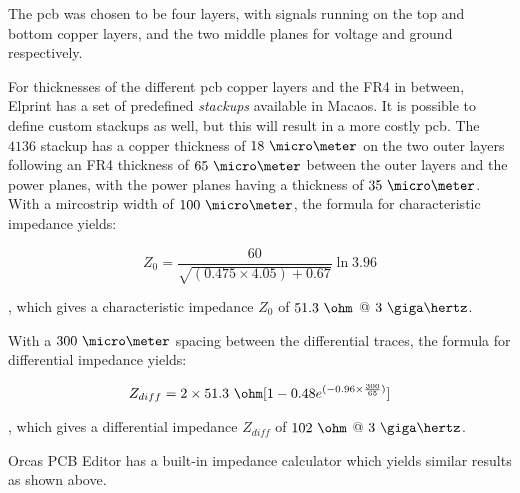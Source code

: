 \documentclass[main.tex]{subfiles}
\begin{document}
The \gls{pcb} was chosen to be four layers, with signals running on the top and bottom copper layers, and the two middle planes for voltage and ground respectively.

For thicknesses of the different \gls{pcb} copper layers and the FR4 in between, Elprint has a set of predefined \textit{stackups} available in Macaos. It is possible to define custom stackups as well, but this will result in a more costly \gls{pcb}. The $4136$ stackup has a copper thickness of $18\ \micro\meter$ on the two outer layers following an FR4 thickness of $65\ \micro\meter$ between the outer layers and the power planes, with the power planes having a thickness of $35\ \micro\meter$. With a mircostrip width of $100\ \micro\meter$, the formula for characteristic impedance yields:

\begin{equation}
Z_0 = \frac{60}{\sqrt{(0.475 \times 4.05) + 0.67}}\ln{3.96}
\end{equation}

, which gives a characteristic impedance $Z_0$ of $51.3\ \ohm$ @ $3\ \giga\hertz$.

With a $300\ \micro\meter$ spacing between the differential traces, the formula for differential impedance yields:

\begin{equation}
    Z_{diff} = 2 \times 51.3\ \ohm [1 - 0.48 e^{(-0.96 \times \frac{300}{65})}]
\end{equation}

, which gives a differential impedance $Z_{diff}$ of $102\ \ohm$ @ $3\ \giga\hertz$.


Orcas PCB Editor has a built-in impedance calculator which yields similar results as shown above.
\end{document}
